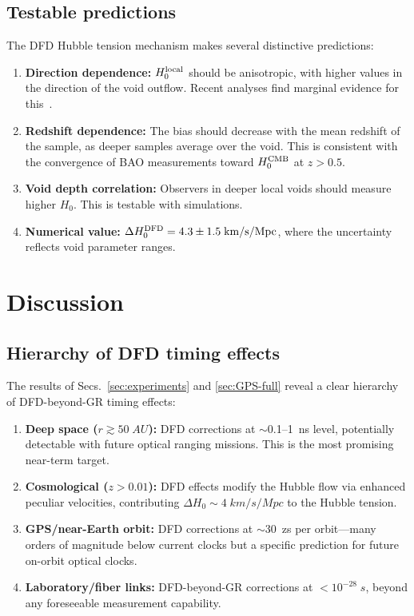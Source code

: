\documentclass[aps,prd,twocolumn,superscriptaddress,nofootinbib,longbibliography]{revtex4-2}
\begin{document}
\subsection{Testable predictions}\label{sec:H0-predictions}

The DFD Hubble tension mechanism makes several distinctive predictions:
\begin{enumerate}
\item \textbf{Direction dependence:} $H_0^{\rm local}$ should be
anisotropic, with higher values in the direction of the void outflow.
Recent analyses find marginal evidence for this~\cite{Migkas2021}.
\item \textbf{Redshift dependence:} The bias should decrease with the
mean redshift of the sample, as deeper samples average over the void.
This is consistent with the convergence of BAO measurements toward
$H_0^{\rm CMB}$ at $z > 0.5$.
\item \textbf{Void depth correlation:} Observers in deeper local
voids should measure higher $H_0$. This is testable with simulations.
\item \textbf{Numerical value:} $\Delta H_0^{\rm DFD} = 4.3 \pm 1.5\;\si{km/s/Mpc}$,
where the uncertainty reflects void parameter ranges.
\end{enumerate}

\section{Discussion}\label{sec:discussion}

\subsection{Hierarchy of DFD timing effects}

The results of Secs.~\ref{sec:experiments} and \ref{sec:GPS-full}
reveal a clear hierarchy of DFD-beyond-GR timing effects:

\begin{enumerate}
\item \textbf{Deep space ($r \gtrsim 50\;\si{AU}$):} DFD corrections at
$\sim$0.1--1~ns level, potentially detectable with future optical ranging
missions. This is the most promising near-term target.
\item \textbf{Cosmological ($z > 0.01$):} DFD effects modify the
Hubble flow via enhanced peculiar velocities, contributing
$\Delta H_0 \sim 4\;\si{km/s/Mpc}$ to the Hubble tension.
\item \textbf{GPS/near-Earth orbit:} DFD corrections at
$\sim$30~zs per orbit---many orders of magnitude below current clocks
but a specific prediction for future on-orbit optical clocks.
\item \textbf{Laboratory/fiber links:} DFD-beyond-GR corrections at
$<10^{-28}\;\si{s}$, beyond any foreseeable measurement capability.
\end{enumerate}
\end{document}
